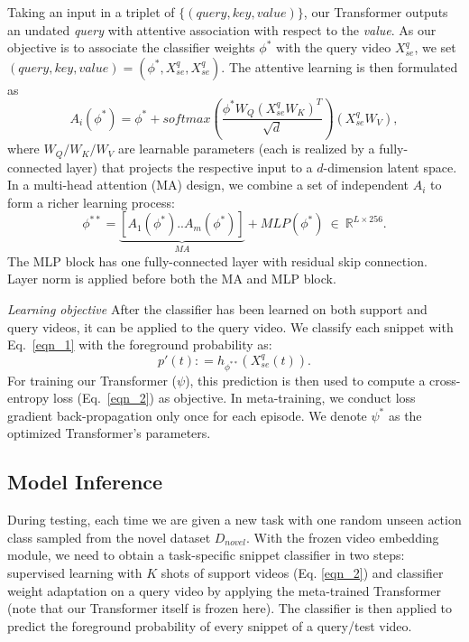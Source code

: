 \documentclass{bmvc2k}
\begin{document}
Taking an input in a triplet of $\{(query, key, value)\}$, our Transformer outputs an undated {\em query} with attentive association with respect to the {\em value}.
As our objective is to associate the classifier weights
$\phi^*$ with the query video $X_{se}^q$,
we set ${(query, key, value)} = (\phi^*, X_{se}^q, X_{se}^q)$.
The attentive learning is then formulated as
\begin{equation}\label{eqn_4}
A_{i}(\phi^*) = \phi^* + softmax(\frac{\phi^* W_{Q} ({X}_{se}^q W_{K})^{T}}{\sqrt{d}}) ({X}_{se}^q W_{V}),
\end{equation}
where $W_{Q}/W_{K}/W_{V}$ are learnable parameters (each is realized by a fully-connected layer) that projects 
the respective input to a $d$-dimension latent space.
In a multi-head attention (MA) design, we combine a set of independent $A_i$
to form a richer learning process:
\begin{equation}\label{eqn_5}
\phi^{**} = \underset{MA}{\underbrace{[A_{1}(\phi^*).. A_{m}(\phi^*)]}} + MLP(\phi^*) \ \in \ \mathbb{R}^{L \times 256}.
\end{equation}
The MLP block has one fully-connected layer with residual skip connection. Layer norm is applied before both the MA and MLP block.




{\em Learning objective }
After the classifier has been learned on both support and query videos, it can be applied to the query video.
We classify each snippet with Eq.~\eqref{eqn_1} with the foreground probability as:
\begin{equation}\label{eqn_6}
p{'}(t) : = h_{\phi^{**}}(X_{se}^q(t)).
\end{equation}
For training our Transformer ($\psi$), this prediction is then used to compute a cross-entropy loss (Eq.~\eqref{eqn_2}) as objective.
In meta-training, we conduct loss gradient back-propagation only once for each episode.
We denote $\psi^*$ as the optimized Transformer's parameters.
 















\subsection{Model Inference}
\label{sec:inference}
During testing, each time we are given a new task with one random unseen action class sampled from the novel dataset $D_{novel}$.
With the frozen video embedding module, we need to 
obtain a task-specific snippet classifier 
in two steps:
supervised learning with $K$ shots of support videos (Eq. \eqref{eqn_2}) 
and 
classifier weight adaptation on a query video 
by applying the meta-trained Transformer 
(note that our Transformer itself is frozen here).
The classifier is then applied to predict the foreground probability
of every snippet of a query/test video.
\end{document}
